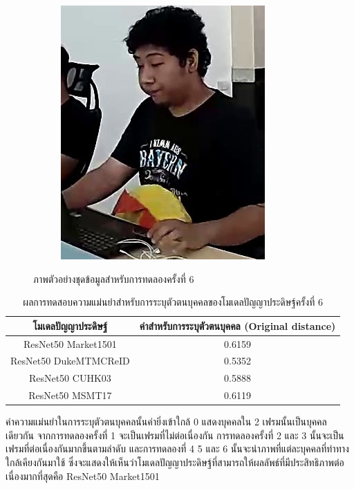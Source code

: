 \begin{figure}[!ht]
\begin{subfigure}[b]{0.2\textwidth}
        \includegraphics[width=\textwidth]{chapter4/images/o_4.jpg}
        \label{fig:ex_6}
    \end{subfigure}
    \caption{ภาพตัวอย่างชุดข้อมูลสำหรับการทดลองครั้งที่ 6}
    \label{fig: ภาพตัวอย่างชุดข้อมูลสำหรับการทดลอง 6}
\end{figure}
\begin{table}[!ht]
    \centering
    \begin{tabular}{|c|c|}
		\hline
		{โมเดลปัญญาประดิษฐ์}&{ค่าสำหรับการระบุตัวตนบุคคล (Original distance)}							\\
		\hline
		ResNet50 Market1501	 			& 0.6159								\\
		ResNet50 DukeMTMCReID			& 0.5352								\\
		ResNet50 CUHK03				& 0.5888								\\
		ResNet50 MSMT17				& 0.6119								\\
	\hline
    \end{tabular}
    \caption{ผลการทดสอบความแม่นยำสำหรับการระบุตัวตนบุคคลของโมเดลปัญญาประดิษฐ์ครั้งที่ 6}
    \label{tab: Original distant of image 6}
\end{table}

ค่าความแม่นยำในการระบุตัวตนบุคคลนั้นค่ายิ่งเข้าใกล้ 0 แสดงบุคคลใน 2 เฟรมนั้นเป็นบุคคลเดียวกัน จากการทดลองครั้งที่ 1 จะเป็นเฟรมที่ไม่ต่อเนื่องกัน การทดลองครั้งที่ 2 และ 3 นั้นจะเป็นเฟรมที่ต่อเนื่องกันมากขึ้นตามลำดับ และการทดลองที่ 4 5 และ 6 นั้นจะนำภาพที่แต่ละบุคคลที่ท่าทางใกล้เคียงกันมาใช้ ซึ่งจะแสดงให้เห็นว่าโมเดลปัญญาประดิษฐ์ที่สามารถให้ผลลัพธ์ที่มีประสิทธิภาพต่อเนื่องมากที่สุดคือ ResNet50 Market1501
